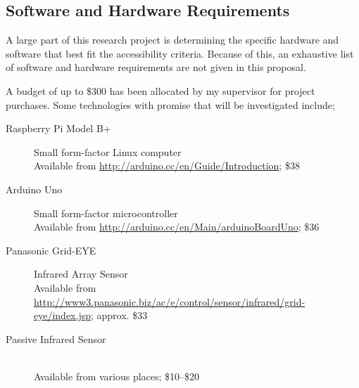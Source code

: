 \documentclass[../thesis/thesis.tex]{subfiles}
\begin{document}
\begin{bibunit}
\section{Software and Hardware Requirements}

A large part of this research project is determining the specific hardware and software that best fit the accessibility criteria. Because of this, an exhaustive list of software and hardware requirements are not given in this proposal.

A budget of up to \$300 has been allocated by my supervisor for project purchases. Some technologies with promise that will be investigated include;

\begin{description}
  \item[Raspberry Pi Model B+] Small form-factor Linux computer \hfill \\
  Available from \url{http://arduino.cc/en/Guide/Introduction}; \$38
  
  \item[Arduino Uno] Small form-factor microcontroller \hfill \\
  Available from \url{http://arduino.cc/en/Main/arduinoBoardUno}; \$36
  
  \item[Panasonic Grid-EYE] Infrared Array Sensor \hfill \\
  Available from \url{http://www3.panasonic.biz/ac/e/control/sensor/infrared/grid-eye/index.jsp}; approx. \$33
  
  \item[Passive Infrared Sensor] \hfill \\
  Available from various places; \$10--\$20
  
\end{description}

\renewcommand{\bibname}{\section{Proposal References} \vskip -1.75cm}
\putbib

\end{bibunit}
\end{document}
